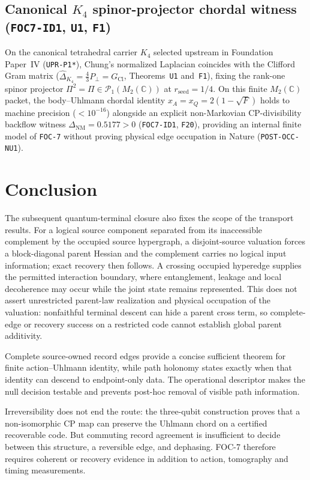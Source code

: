 \documentclass[11pt]{article}
\begin{document}
\subsection{Canonical \texorpdfstring{$K_4$}{K4} spinor-projector chordal witness (\texttt{FOC7-ID1}, \texttt{U1}, \texttt{F1})}
\label{sec:paperiii-k4-chordal-20261114}
On the canonical tetrahedral carrier $K_4$ selected upstream in Foundation Paper~IV (\texttt{UPR-P1*}), Chung's normalized Laplacian coincides with the Clifford Gram matrix ($\widehat{\Delta}_{K_4}=\frac{4}{3}P_\perp=G_{\mathrm{Cl}}$, Theorems~\texttt{U1} and~\texttt{F1}), fixing the rank-one spinor projector $\Pi^2=\Pi\in\mathcal{P}_1(M_2(\mathbb{C}))$ at $r_{\mathrm{seed}}=1/4$. On this finite $M_2(\mathbb{C})$ packet, the body--Uhlmann chordal identity $x_A=x_Q=2(1-\sqrt{F})$ holds to machine precision ($<10^{-16}$) alongside an explicit non-Markovian CP-divisibility backflow witness $\Delta_{\mathrm{NM}}=0.5177>0$ (\texttt{FOC7-ID1}, \texttt{F20}), providing an internal finite model of \texttt{FOC-7} without proving physical edge occupation in Nature (\texttt{POST-OCC-NU1}).

\section{Conclusion}

The subsequent quantum-terminal closure also fixes the scope of the transport
results. For a logical source component separated from its inaccessible
complement by the occupied source hypergraph, a disjoint-source valuation
forces a block-diagonal parent Hessian and the complement carries no logical
input information; exact recovery then follows. A crossing occupied
hyperedge supplies the permitted interaction boundary, where entanglement,
leakage and local decoherence may occur while the joint state remains
represented. This does not assert unrestricted parent-law realization and
physical occupation of the valuation:
nonfaithful terminal descent can hide a parent cross term, so complete-edge
or recovery success on a restricted code cannot establish global parent
additivity.

Complete source-owned record edges provide a concise sufficient theorem for
finite action--Uhlmann identity, while path holonomy states exactly when that
identity can descend to endpoint-only data.  The operational descriptor makes
the null decision testable and prevents post-hoc removal of visible path
information.

Irreversibility does not end the route: the three-qubit construction proves
that a non-isomorphic CP map can preserve the Uhlmann chord on a certified
recoverable code.  But commuting record agreement is insufficient to decide
between this structure, a reversible edge, and dephasing.  FOC-7 therefore
requires coherent or recovery evidence in addition to action, tomography and
timing measurements.
\end{document}
